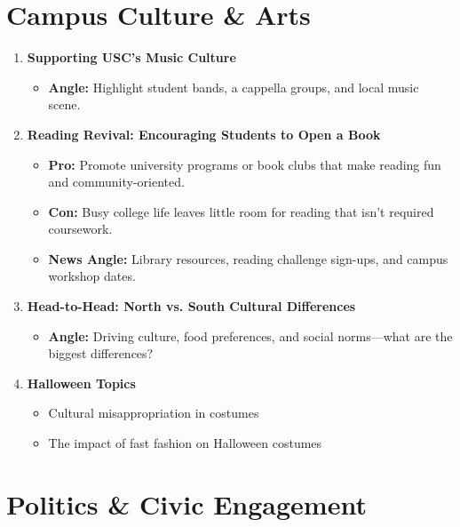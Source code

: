 \documentclass{article}
\begin{document}
\section*{Campus Culture \& Arts}

\begin{enumerate}[leftmargin=*]
    \item \textbf{Supporting USC's Music Culture}
    \begin{itemize}
        \item \textbf{Angle:} Highlight student bands, a cappella groups, and local music scene.
    \end{itemize}

    \item \textbf{Reading Revival: Encouraging Students to Open a Book}
    \begin{itemize}
        \item \textbf{Pro:} Promote university programs or book clubs that make reading fun and community-oriented.
        \item \textbf{Con:} Busy college life leaves little room for reading that isn't required coursework.
        \item \textbf{News Angle:} Library resources, reading challenge sign-ups, and campus workshop dates.
    \end{itemize}

    \item \textbf{Head-to-Head: North vs. South Cultural Differences}
    \begin{itemize}
        \item \textbf{Angle:} Driving culture, food preferences, and social norms---what are the biggest differences?
    \end{itemize}

    \item \textbf{Halloween Topics}
    \begin{itemize}
        \item Cultural misappropriation in costumes
        \item The impact of fast fashion on Halloween costumes
    \end{itemize}
\end{enumerate}

\section*{Politics \& Civic Engagement}
\end{document}
